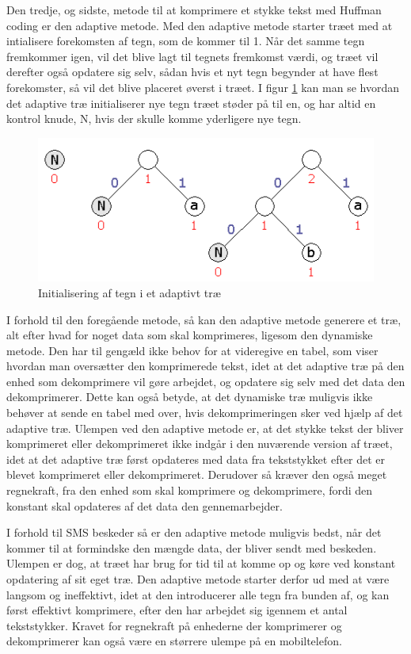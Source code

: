 Den tredje, og sidste, metode til at komprimere et stykke tekst med Huffman coding er den adaptive metode. Med den adaptive metode starter træet med at intialisere forekomsten af tegn, som de kommer til 1. Når det samme tegn fremkommer igen, vil det blive lagt til tegnets fremkomst værdi, og træet vil derefter også opdatere sig selv, sådan hvis et nyt tegn begynder at have flest forekomster, så vil det blive placeret øverst i træet. I figur \ref{fig:adaptive_tree} kan man se hvordan det adaptive træ initialiserer nye tegn træet støder på til en, og har altid en kontrol knude, N, hvis der skulle komme yderligere nye tegn.

\begin{figure}[H]
\centering
\includegraphics[width=0.75\linewidth]{Billeder/adaptivt.png}
\caption{Initialisering af tegn i et adaptivt træ \cite{Hufftree_1}}
\label{fig:adaptive_tree}
\end{figure}

I forhold til den foregående metode, så kan den adaptive metode generere et træ, alt efter hvad for noget data som skal komprimeres, ligesom den dynamiske metode. Den har til gengæld ikke behov for at videregive en tabel, som viser hvordan man oversætter den komprimerede tekst, idet at det adaptive træ på den enhed som dekomprimere vil gøre arbejdet, og opdatere sig selv med det data den dekomprimerer. Dette kan også betyde, at det dynamiske træ muligvis ikke behøver at sende en tabel med over, hvis dekomprimeringen sker ved hjælp af det adaptive træ. Ulempen ved den adaptive metode er, at det stykke tekst der bliver komprimeret eller dekomprimeret ikke indgår i den nuværende version af træet, idet at det adaptive træ først opdateres med data fra tekststykket efter det er blevet komprimeret eller dekomprimeret. Derudover så kræver den også meget regnekraft, fra den enhed som skal komprimere og dekomprimere, fordi den konstant skal opdateres af det data den gennemarbejder. \cite{Hufftree_5}

I forhold til SMS beskeder så er den adaptive metode muligvis bedst, når det kommer til at formindske den mængde data, der bliver sendt med beskeden. Ulempen er dog, at træet har brug for tid til at komme op og køre ved konstant opdatering af sit eget træ. Den adaptive metode starter derfor ud med at være langsom og ineffektivt, idet at den introducerer alle tegn fra bunden af, og kan først effektivt komprimere, efter den har arbejdet sig igennem et antal tekststykker. Kravet for regnekraft på enhederne der komprimerer og dekomprimerer kan også være en størrere ulempe på en mobiltelefon.
